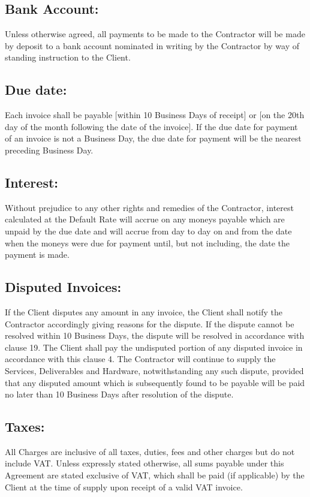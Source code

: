 \documentclass[a4paper,12pt]{article}
\begin{document}
\subsection{Bank Account:}  Unless otherwise agreed, all payments to be made to the Contractor will be made by deposit to a bank account nominated in writing by the Contractor by way of standing instruction to the Client.
\subsection{Due date:}  Each invoice shall be payable [within 10 Business Days of receipt] or [on the 20th day of the month following the date of the invoice].  If the due date for payment of an invoice is not a Business Day, the due date for payment will be the nearest preceding Business Day.
\subsection{Interest:}  Without prejudice to any other rights and remedies of the Contractor, interest calculated at the Default Rate will accrue on any moneys payable which are unpaid by the due date and will accrue from day to day on and from the date when the moneys were due for payment until, but not including, the date the payment is made. 
\subsection{Disputed Invoices:}   If the Client disputes any amount in any invoice, the Client shall notify the Contractor accordingly giving reasons for the dispute.  If the dispute cannot be resolved within 10 Business Days, the dispute will be resolved in accordance with clause 19.  The Client shall pay the undisputed portion of any disputed invoice in accordance with this clause 4.  The Contractor will continue to supply the Services, Deliverables and Hardware, notwithstanding any such dispute, provided that any disputed amount which is subsequently found to be payable will be paid no later than 10 Business Days after resolution of the dispute. 
\subsection{Taxes:}  All Charges are inclusive of all taxes, duties, fees and other charges but do not include VAT.  Unless expressly stated otherwise, all sums payable under this Agreement are stated exclusive of VAT, which shall be paid (if applicable) by the Client at the time of supply upon receipt of a valid VAT invoice. 
\end{document}
